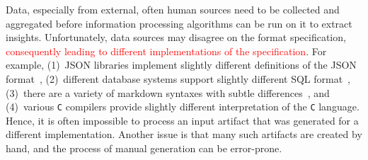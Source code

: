 \documentclass[sigconf,review,anonymous]{acmart}
\def\<#1>{\texttt{#1}}
\newcommand{\recheck}[1]{\textcolor{red}{#1}}
\begin{document}
Data, especially from external, often human sources need to be collected and
aggregated before information processing algorithms can be run on it to extract
insights. Unfortunately, data sources may disagree on the format specification, %
\recheck{consequently leading to different %
implementations of the specification}.
For example, (1)~JSON libraries implement slightly different
definitions of the JSON format~\cite{harrand2021behavioral,seriot2016parsing},
(2)~different database systems support %
slightly different SQL format~\cite{arvin2018comparison}, (3)~there are a variety of markdown
syntaxes with subtle differences~\cite{visnoviz2019comparison}, and (4)~various
\<C> compilers %
provide slightly different interpretation of the \<C> language.
Hence, it is often impossible to process an input artifact that was generated for
a different implementation. %
Another issue is that many such artifacts
are created by hand, and the process of manual generation can be error-prone.
\end{document}
